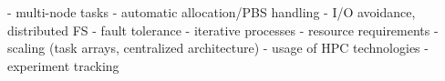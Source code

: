 - multi-node tasks
- automatic allocation/PBS handling
- I/O avoidance, distributed FS
- fault tolerance
- iterative processes
- resource requirements
- scaling (task arrays, centralized architecture)
- usage of HPC technologies
- experiment tracking
